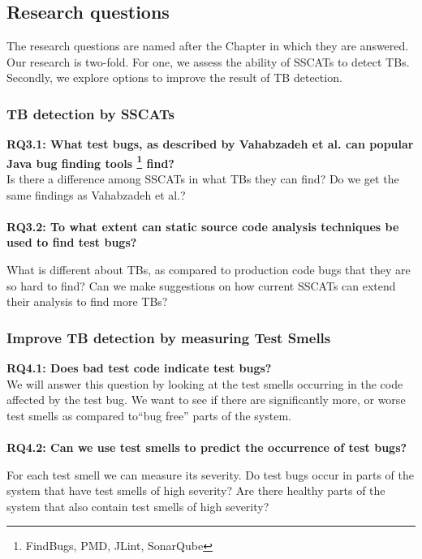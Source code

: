 \documentclass{uvamscse}
\newcommand{\Atestbugs}{Vahabzadeh et al.}
\begin{document}
\subsection{Research questions}
The research questions are named after the Chapter in which they are answered. Our research is two-fold. For one, we assess the ability of SSCATs to detect TBs. Secondly, we explore options to improve the result of TB detection.

\subsubsection{TB detection by SSCATs}
\textbf{RQ3.1: What test bugs, as described by \Atestbugs{} can popular Java bug finding tools \footnote{FindBugs, PMD, JLint, SonarQube} find?} \label{RQ_3.1} \\

Is there a difference among SSCATs in what TBs they can find? Do we get the same findings as \Atestbugs{}?\\ \\
\textbf{RQ3.2: To what extent can static source code analysis techniques be used to find test bugs?} \\
\label{RQ_3.2}

What is different about TBs, as compared to production code bugs that they are so hard to find? Can we make suggestions on how current SSCATs can extend their analysis to find more TBs?

\subsubsection{Improve TB detection by measuring Test Smells}
\textbf{RQ4.1: Does bad test code indicate test bugs? \label{RQ_4.1}} \\

We will answer this question by looking at the test smells occurring in the code affected by the test bug. We want to see if there are significantly more, or worse test smells as compared to``bug free'' parts of the system.\\ \\
\textbf{RQ4.2: Can we use test smells to predict the occurrence of test bugs?} \\
\label{RQ_4.2}

For each test smell we can measure its severity. Do test bugs occur in parts of the system that have test smells of high severity? Are there healthy parts of the system that  also contain test smells of high severity?
\end{document}
